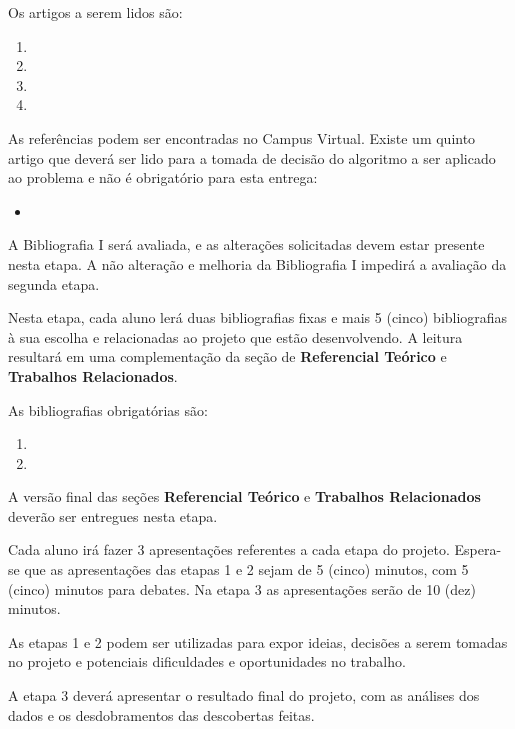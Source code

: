 \documentclass[a4 paper]{article}
\begin{document}
Os artigos a serem lidos são:

\begin{enumerate}
    \item {}
    \item {}
    \item {}
    \item {}
\end{enumerate}

As referências podem ser encontradas no Campus Virtual. Existe um quinto artigo que deverá ser lido para a tomada de decisão do algoritmo a ser aplicado ao problema e não é obrigatório para esta entrega:

\begin{itemize}
    \item {}
\end{itemize}



A Bibliografia I será avaliada, e as alterações solicitadas devem estar presente nesta etapa. A não alteração e melhoria da Bibliografia I impedirá a avaliação da segunda etapa.

Nesta etapa, cada aluno lerá duas bibliografias fixas e mais 5 (cinco) bibliografias à sua escolha e relacionadas ao projeto que estão desenvolvendo. A leitura resultará em uma complementação da seção de \textbf{Referencial Teórico} e \textbf{Trabalhos Relacionados}.

As bibliografias obrigatórias são:

\begin{enumerate}
    \item {}
    \item {}
\end{enumerate}

A versão final das seções \textbf{Referencial Teórico} e \textbf{Trabalhos Relacionados} deverão ser entregues nesta etapa.


Cada aluno irá fazer 3 apresentações referentes a cada etapa do projeto. Espera-se que as apresentações das etapas 1 e 2 sejam de 5 (cinco) minutos, com 5 (cinco) minutos para debates. Na etapa 3 as apresentações serão de 10 (dez) minutos.

As etapas 1 e 2 podem ser utilizadas para expor ideias, decisões a serem tomadas no projeto e potenciais dificuldades e oportunidades no trabalho.

A etapa 3 deverá apresentar o resultado final do projeto, com as análises dos dados e os desdobramentos das descobertas feitas.



\end{document}
